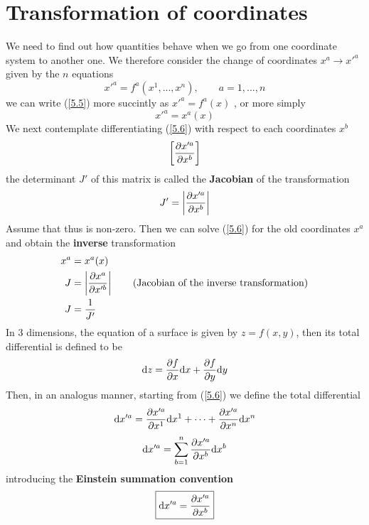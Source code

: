 \section{Transformation of coordinates}
We need to find out how quantities behave when we go from one coordinate system to another one. We therefore consider the change of coordinates $x^{a}\to x'^{a}$ given by the $n$ equations
\begin{equation}\label{5.5}
  x'^{a}=f^{a}(x^1,...,x^n),\qquad a=1,...,n 
\end{equation}
we can write (\ref{5.5}) more succintly as $x'^{a}=f^{a}(x)$ , or more simply
\begin{equation}        \label{5.6}
  \boxed{x'^{a}=x^{a}(x)}
\end{equation}
We next contemplate differentiating (\ref{5.6}) with respect to each coordinates $x^b$
\begin{equation*}
  \left[\pdv{x'^{a}}{x^b}\right] 
\end{equation*}
the determinant $J'$ of this matrix is called the \textbf{Jacobian} of the transformation 
\begin{equation}                   \label{5.8}
  J'=\left|\pdv{x'^{a}}{x^b}\right|
\end{equation}
Assume that thus is non-zero. Then we can solve (\ref{5.6}) for the old coordinates $x^{a}$ and obtain the \textbf{inverse} transformation
\begin{align*}
  x^{a}&=x^{a}(x)\\
  J&=\left|\pdv{x^{a}}{x'^b}\right| \qquad (\mbox{Jacobian of the inverse transformation})\\
  J&=\frac{1}{J'}
\end{align*}
In 3 dimensions, the equation of a surface is given by $z=f(x,y)$, then its total differential is defined to be
\begin{equation*}
  \dd z =\pdv{f}{x}\dd x + \pdv{f}{y}\dd y
\end{equation*}
Then, in an analogus manner, starting from (\ref{5.6}) we define the total differential 
\begin{equation*}
  \dd x'^{a}=\pdv{x'^{a}}{x^1}\dd x^1+\cdots +\pdv{x'^{a}}{x^n}\dd x^n
\end{equation*}
\begin{equation}                                   \label{5.10}
  \dd x'^{a} =\sum_{b=1}^n\pdv{x'^{a}}{x^b}\dd x^b 
\end{equation}
introducing the \textbf{Einstein summation convention}
\begin{equation}                   \label{5.11}
  \boxed{\dd x'^{a}=\pdv{x'^{a}}{x^b}}
\end{equation}
